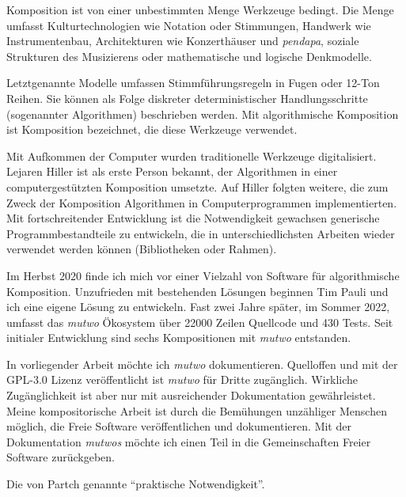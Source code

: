 \documentclass[12pt,a4paper,ngerman]{article}
\begin{document}
Komposition ist von einer unbestimmten Menge Werkzeuge bedingt.
Die Menge umfasst Kulturtechnologien wie Notation oder Stimmungen, Handwerk wie Instrumentenbau, Architekturen wie Konzerthäuser und \emph{pendapa}, soziale Strukturen des Musizierens oder mathematische und logische Denkmodelle.

Letztgenannte Modelle umfassen Stimmführungsregeln in Fugen oder 12-Ton Reihen.
Sie können als Folge diskreter deterministischer Handlungsschritte (sogenannter Algorithmen) beschrieben werden.
Mit algorithmische Komposition ist Komposition bezeichnet, die diese Werkzeuge verwendet.

Mit Aufkommen der Computer wurden traditionelle Werkzeuge digitalisiert.
Lejaren Hiller ist als erste Person bekannt, der Algorithmen in einer computergestützten Komposition umsetzte.
Auf Hiller folgten weitere, die zum Zweck der Komposition Algorithmen in Computerprogrammen implementierten.
Mit fortschreitender Entwicklung ist die Notwendigkeit gewachsen generische Programmbestandteile zu entwickeln, die in unterschiedlichsten Arbeiten wieder verwendet werden können (Bibliotheken oder Rahmen).

Im Herbst 2020 finde ich mich vor einer Vielzahl von Software für algorithmische Komposition.
Unzufrieden mit bestehenden Lösungen beginnen Tim Pauli und ich eine eigene Lösung zu entwickeln.
Fast zwei Jahre später, im Sommer 2022, umfasst das \emph{mutwo} Ökosystem über 22000 Zeilen Quellcode und 430 Tests.
Seit initialer Entwicklung sind sechs Kompositionen mit \emph{mutwo} entstanden.

In vorliegender Arbeit möchte ich \emph{mutwo} dokumentieren.
Quelloffen und mit der GPL-3.0 Lizenz veröffentlicht ist \emph{mutwo} für Dritte zugänglich.
Wirkliche Zugänglichkeit ist aber nur mit ausreichender Dokumentation gewährleistet.
Meine kompositorische Arbeit ist durch die Bemühungen unzähliger Menschen möglich, die Freie Software veröffentlichen und dokumentieren.
Mit der Dokumentation \emph{mutwos} möchte ich einen Teil in die Gemeinschaften Freier Software zurückgeben.

Die von Partch genannte ``praktische Notwendigkeit''.



%
\end{document}

